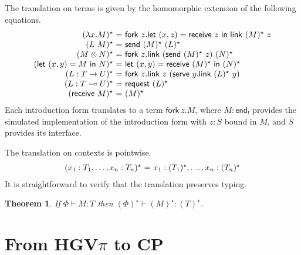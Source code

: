 \documentclass{easychair}
\makeatletter
\newtheorem{theorem}{Theorem}
\newcommand{\ba}{\begin{array}}
\newcommand{\ea}{\end{array}}
\newenvironment{equations}{\[\ba{@{}r@{~}c@{~}l@{}}}{\ea\]}
\newcommand{\key}{\mathsf}
\newcommand{\gvEndOutput}{\key{end}_!}
\newcommand{\gvDual}[1]{\overline{#1}}
\newcommand{\gvj}[3]{{#1} \vdash {#2} : {#3}}
\newcommand{\lolli}{\multimap}
\newcommand{\gvLinFun}[2]{{#1} \lolli {#2}}
\newcommand{\gvUnFun}[2]{{#1} \to {#2}}
\newcommand{\gvTimes}[2]{{#1} \otimes {#2}}
\newcommand{\gvLink}[2]{\key{link}~{#1}~{#2}}
\newcommand{\gvLam}[2]{\lambda {#1}.{#2}}
\newcommand{\gvApp}[2]{{#1}~{#2}}
\newcommand{\gvPair}[2]{({#1},{#2})}
\newcommand{\gvLet}[3]{\key{let}~{#1}={#2}~\key{in}~{#3}}
\newcommand{\gvSend}[2]{\key{send}~{#1}~{#2}}
\newcommand{\gvReceive}[1]{\key{receive}~{#1}}
\newcommand{\gvFork}[2]{\key{fork}~{#1}.{#2}}
\newcommand{\gvServe}[2]{\key{serve}~{#1}.{#2}}
\newcommand{\gvRequest}[1]{\key{request}~{#1}}
\newcommand{\hgvpi}{HGV$\pi$\xspace}
\newcommand{\lampi}[1]{({#1})^\star}
\makeatother
\begin{document}
The translation on terms is given by the homomorphic extension of the
following equations.
\begin{equations}
\lampi{\gvLam{x}{M}} &=& \gvFork{z}{\gvLet{\gvPair{x}{z}}{\gvReceive{z}}{\gvLink{\lampi{M}}{z}}} \\
\lampi{\gvApp{L}{M}} &=& \gvSend{\lampi{M}}{\lampi{L}} \\
\lampi{\gvTimes{M}{N}} &=&
  \gvFork{z}
    {\gvLink{(\gvSend{\lampi{M}}{z})}{\lampi{N}}} \\
\lampi{\gvLet{\gvPair{x}{y}}{M}{N}} &=&
    \gvLet{\gvPair{x}{y}}{\gvReceive{\lampi{M}}}{\lampi{N}} \\
\lampi{L : \gvUnFun{T}{U}} &=&
  \gvFork{z}{\gvLink{z}{(\gvServe{y}{\gvLink{\lampi{L}}{y}})}} \\
\lampi{L : \gvLinFun{T}{U}} &=& \gvRequest{\lampi{L}} \\
\lampi{\gvReceive{M}} &=& \lampi{M} \\
\end{equations}%
Each introduction form translates to a term $\gvFork{z}{M}$, where $M
: \gvEndOutput$ provides the simulated implementation of the
introduction form with $z : S$ bound in $M$, and $\gvDual{S}$ provides
its interface.

The translation on contexts is pointwise.
\begin{equations}
\lampi{x_1:T_1, \dots, x_n:T_n} &=& x_1:\lampi{T_1}, \dots, x_n:\lampi{T_n} \\
\end{equations}%
It is straightforward to verify that the translation preserves typing.
\begin{theorem}
If $\gvj{\Phi}{M}{T}$ then $\gvj{\lampi{\Phi}}{\lampi{M}}{\lampi{T}}$.
\end{theorem}




\section{From \hgvpi to CP}
~
\end{document}
